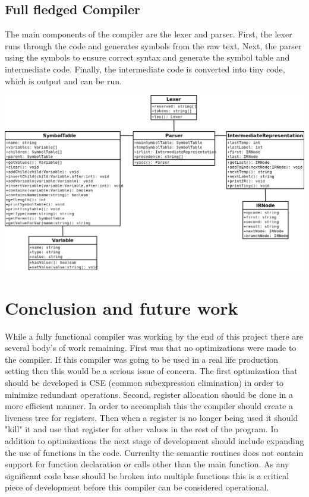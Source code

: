 \documentclass[12pt]{article}
\begin{document}
        \subsection{Full fledged Compiler}
            The main components of the compiler are the lexer and parser.
            First, the lexer runs through the code and generates symbols from the raw text.
            Next, the parser using the symbols to ensure correct syntax and generate the symbol table and intermediate code.
            Finally, the intermediate code is converted into tiny code, which is output and can be run.
            \begin{center}
                \includegraphics[width=\linewidth]{uml}
            \end{center}

    \section{Conclusion and future work}    
            While a fully functional compiler was working by the end of this project there are several body's of work remaining.  First was that no optimizations were made to the compiler.  If this compiler was going to be used in a real life production setting then this would be a serious issue of concern.  The first optimization that should be developed is CSE (common subexpression elimination) in order to minimize redundant operations.  Second, register allocation should be done in a more efficient manner.  In order to accomplish this the compiler should create a liveness tree for registers.  Then when a register is no longer being used it should "kill" it and use that register for other values in the rest of the program.  
            In addition to optimizations the next stage of development should include expanding the use of functions in the code.  Currenlty the semantic routines does not contain support for function declaration or calls other than the main function.  As any significant code base should be broken into multiple functions this is a critical piece of development before this compiler can be considered operational.
    
 
\end{document}
